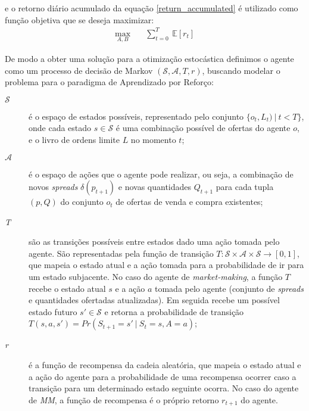 e o retorno diário acumulado da equação \ref{return_accumulated} é utilizado como função objetiva que se deseja maximizar:
\begin{equation}
	\begin{aligned}
		\max_{A, B} \quad & \sum_{t=0}^{T} \ \mathbb{E} [r_{t}]
	\end{aligned}
\end{equation}

De modo a obter uma solução para a otimização estocástica definimos o agente como um processo de decisão de Markov $(\mathcal{S}, \mathcal{A}, T, r)$, buscando modelar o problema para o paradigma de Aprendizado por Reforço:

\begin{description}
	\item[$\mathcal{S}$] 
	é o espaço de estados possíveis, representado pelo conjunto $\{o_{t}, L_{t}) \ | \ t < T\}$, onde cada estado $s \in \mathcal{S}$ é uma combinação possível de ofertas do agente $o$, e o livro de ordens limite $L$ no momento $t$;
	
	\item[$\mathcal{A}$] é o espaço de ações que o agente pode realizar, ou seja, a combinação de novos \textit{spreads} $\delta(p_{t + 1})$ e novas quantidades $Q_{t+1}$ para cada tupla $(p, Q)$ do conjunto $o_{t}$ de ofertas de venda e compra existentes;
	
	\item[\textit{T}] são as transições possíveis entre estados dado uma ação tomada pelo agente. São representadas pela função de transição $T :  \mathcal{S} \times \mathcal{A} \times \mathcal{S} \rightarrow [0, 1]$, que mapeia o estado atual e a ação tomada para a probabilidade de ir para um estado subjacente. No caso do agente de \textit{market-making}, a função $T$ recebe o estado atual $s$ e a ação $a$ tomada pelo agente (conjunto de \textit{spreads} e quantidades ofertadas atualizadas). Em seguida recebe um possível estado futuro $s' \in \mathcal{S}$ e retorna a probabilidade de transição $T(s, a, s') = Pr(S_{t+1} = s' \ | \ S_{t} = s, A = a)$;
	
	\item[\textit{r}] é a função de recompensa da cadeia aleatória, que mapeia o estado atual e a ação do agente para a probabilidade de uma recompensa ocorrer caso a transição para um determinado estado seguinte ocorra. No caso do agente de \textit{MM}, a função de recompensa é o próprio retorno $r_{t+1}$ do agente.
\end{description}

